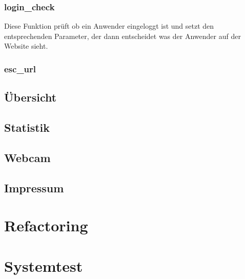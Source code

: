 \subsubsection{login\_check}
Diese Funktion prüft ob ein Anwender eingeloggt ist und setzt den entsprechenden
Parameter, der dann entscheidet was der Anwender auf der Website sieht.

\subsubsection{esc\_url}


\subsection{Übersicht}

\subsection{Statistik}

\subsection{Webcam}

\subsection{Impressum}

\section{Refactoring}
\section{Systemtest}
